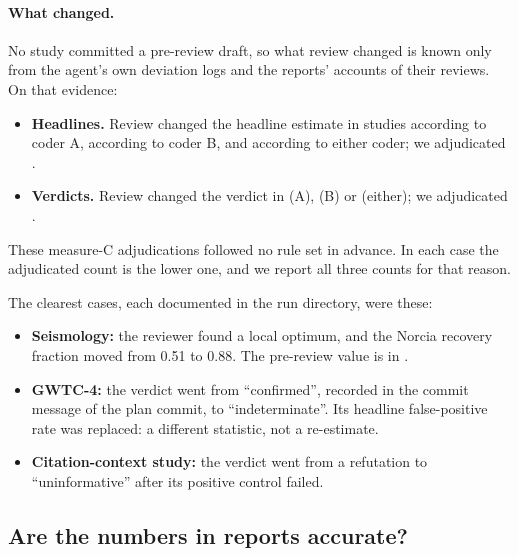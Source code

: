 \paragraph{What changed.} No study committed a pre-review draft, so what review changed is known only from the agent's
own deviation logs and the reports' accounts of their reviews. On that evidence:
\begin{itemize}
\item \textbf{Headlines.} Review changed the headline estimate in \CHeadlineA{} studies according to coder A,
\CHeadlineB{} according to coder B, and \CHeadlineEither{} according to either coder; we adjudicated \ReviewHeadlineChanged{}.
\item \textbf{Verdicts.} Review changed the verdict in \CVerdictA{} (A), \CVerdictB{} (B) or \CVerdictEither{}
(either); we adjudicated \ReviewVerdictChanged{}.
\end{itemize}
These measure-C adjudications followed no rule set in advance. In each case the adjudicated count is the lower one,
and we report all three counts for that reason.

The clearest cases, each documented in the run directory, were these:
\begin{itemize}
\item \textbf{Seismology:} the reviewer found a local optimum, and the Norcia recovery fraction moved from 0.51 to
0.88. The pre-review value is in .
\item \textbf{GWTC-4:} the verdict went from ``confirmed'', recorded in the commit message of the plan commit, to
``indeterminate''. Its headline false-positive rate was replaced: a different statistic, not a re-estimate.
\item \textbf{Citation-context study:} the verdict went from a refutation to ``uninformative'' after its positive
control failed.
\end{itemize}

\subsection{Are the numbers in reports accurate?}

